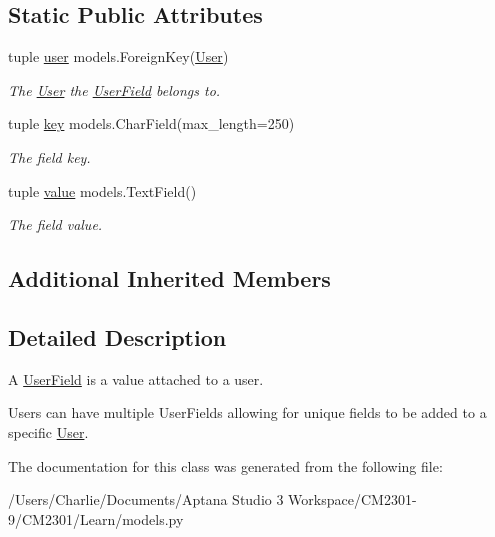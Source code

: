 \subsection*{Static Public Attributes}
\begin{DoxyCompactItemize}
\item 
\hypertarget{class_learn_1_1models_1_1_user_field_a0862a63a5ba3220152b87c96d36565d2}{tuple \hyperlink{class_learn_1_1models_1_1_user_field_a0862a63a5ba3220152b87c96d36565d2}{user} models.\-Foreign\-Key(\hyperlink{class_learn_1_1models_1_1_user}{User})}\label{class_learn_1_1models_1_1_user_field_a0862a63a5ba3220152b87c96d36565d2}

\begin{DoxyCompactList}\small\item\em The \hyperlink{class_learn_1_1models_1_1_user}{User} the \hyperlink{class_learn_1_1models_1_1_user_field}{User\-Field} belongs to. \end{DoxyCompactList}\item 
\hypertarget{class_learn_1_1models_1_1_user_field_a2dab1d7cf7c6fd1ab7f2811808a4f9b5}{tuple \hyperlink{class_learn_1_1models_1_1_user_field_a2dab1d7cf7c6fd1ab7f2811808a4f9b5}{key} models.\-Char\-Field(max\-\_\-length=250)}\label{class_learn_1_1models_1_1_user_field_a2dab1d7cf7c6fd1ab7f2811808a4f9b5}

\begin{DoxyCompactList}\small\item\em The field key. \end{DoxyCompactList}\item 
\hypertarget{class_learn_1_1models_1_1_user_field_a5dcb33b60bc478fcc5eaff5d526f7a71}{tuple \hyperlink{class_learn_1_1models_1_1_user_field_a5dcb33b60bc478fcc5eaff5d526f7a71}{value} models.\-Text\-Field()}\label{class_learn_1_1models_1_1_user_field_a5dcb33b60bc478fcc5eaff5d526f7a71}

\begin{DoxyCompactList}\small\item\em The field value. \end{DoxyCompactList}\end{DoxyCompactItemize}
\subsection*{Additional Inherited Members}


\subsection{Detailed Description}
A \hyperlink{class_learn_1_1models_1_1_user_field}{User\-Field} is a value attached to a user. 

Users can have multiple User\-Fields allowing for unique fields to be added to a specific \hyperlink{class_learn_1_1models_1_1_user}{User}. 

The documentation for this class was generated from the following file\-:\begin{DoxyCompactItemize}
\item 
/\-Users/\-Charlie/\-Documents/\-Aptana Studio 3 Workspace/\-C\-M2301-\/9/\-C\-M2301/\-Learn/models.\-py\end{DoxyCompactItemize}
